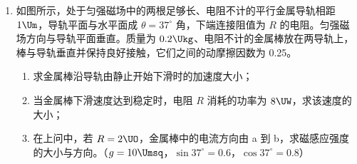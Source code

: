 \documentclass[\gkver]{gaokaozhenti}
\begin{document}
\begin{enumerate}
{在缓慢加热到 $127\UduC$ 的过程中压强保持不变，由盖-吕萨克定律得

$\frac{V_{1}}{T_{0}}=\frac{V_{2}}{T_{2}}$ ③

由③式解得 $V_{2}=\frac{T_{2}}{T_{0}}V_{1}=\frac{273+127}{273}\times1.0\times10^{-3}\Umc\approx1.47\times10^{-3}\Umc$ ④

（2）在 $p-V$ 图上画出整个过程中气缸内气体的状态变化，如图所示。

\onepicture[w=4.81cm]{}
}

\item
如图所示，处于匀强磁场中的两根足够长、电阻不计的平行金属导轨相距 $1\Um$，导轨平面与水平面成 $\theta=37^{\circ}$ 角，下端连接阻值为 $R$ 的电阻。匀强磁场方向与导轨平面垂直。质量为 $0.2\Ukg$、电阻不计的金属棒放在两导轨上，棒与导轨垂直并保持良好接触，它们之间的动摩擦因数为 0.25。

\begin{enumerate}
	\item
	求金属棒沿导轨由静止开始下滑时的加速度大小；
	\item
	当金属棒下滑速度达到稳定时，电阻 $R$ 消耗的功率为 $8\UW$，求该速度的大小；
	\item
	在上问中，若 $R=2\UO$，金属棒中的电流方向由 a 到 b，求磁感应强度的大小与方向。（$g=10\Umsq$，$\sin37^{\circ}=0.6$，$\cos37^{\circ}=0.8$）
\end{enumerate}

\onepicture[align=right, w=4.34cm]{}

\end{enumerate}
\end{document}
